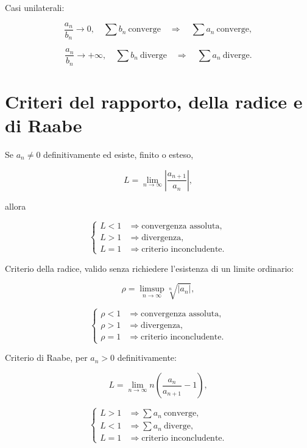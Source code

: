 Casi unilaterali:

\[
\displaystyle
\frac{a_n}{b_n}\to0,\quad
\sum b_n\ \text{converge}
\quad\Longrightarrow\quad
\sum a_n\ \text{converge},
\]

\[
\displaystyle
\frac{a_n}{b_n}\to+\infty,\quad
\sum b_n\ \text{diverge}
\quad\Longrightarrow\quad
\sum a_n\ \text{diverge}.
\]

\section{Criteri del rapporto, della radice e di Raabe}\label{criteri-del-rapporto-della-radice-e-di-raabe}

Se \(a_n\ne0\) definitivamente ed esiste, finito o esteso,

\[
\displaystyle
L=\lim_{n\to\infty}\left\lvert\frac{a_{n+1}}{a_n}\right\rvert,
\]

allora

\[
\displaystyle
\begin{cases}
L<1 &\Longrightarrow \text{convergenza assoluta},\\
L>1 &\Longrightarrow \text{divergenza},\\
L=1 &\Longrightarrow \text{criterio inconcludente}.
\end{cases}
\]

Criterio della radice, valido senza richiedere l'esistenza di un limite ordinario:

\[
\displaystyle
\rho=\limsup_{n\to\infty}\sqrt[n]{\lvert a_n\rvert},
\]

\[
\displaystyle
\begin{cases}
\rho<1 &\Longrightarrow \text{convergenza assoluta},\\
\rho>1 &\Longrightarrow \text{divergenza},\\
\rho=1 &\Longrightarrow \text{criterio inconcludente}.
\end{cases}
\]

Criterio di Raabe, per \(a_n>0\) definitivamente:

\[
\displaystyle
L=\lim_{n\to\infty}
n\left(\frac{a_n}{a_{n+1}}-1\right),
\]

\[
\displaystyle
\begin{cases}
L>1 &\Longrightarrow \sum a_n\ \text{converge},\\
L<1 &\Longrightarrow \sum a_n\ \text{diverge},\\
L=1 &\Longrightarrow \text{criterio inconcludente}.
\end{cases}
\]

